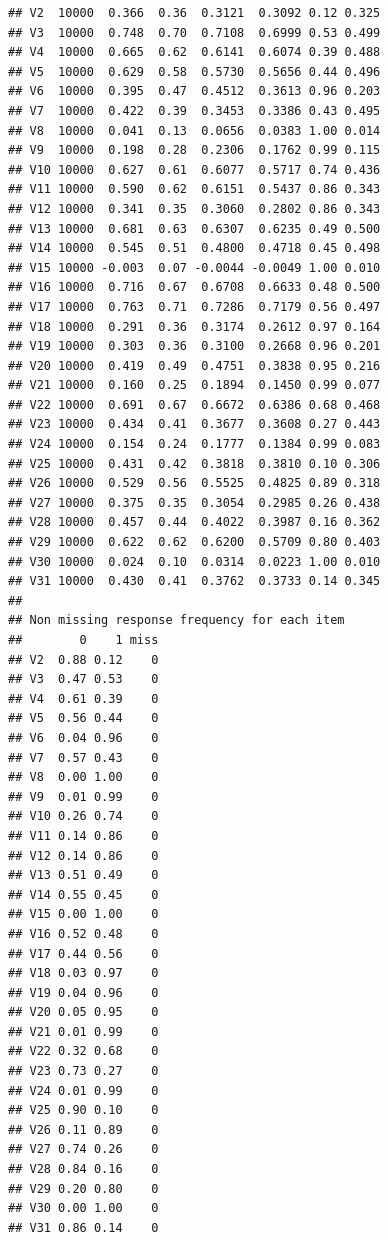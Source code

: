 \documentclass[
  english,
  man]{apa6}
\begin{document}
\begin{verbatim}
## V2  10000  0.366  0.36  0.3121  0.3092 0.12 0.325
## V3  10000  0.748  0.70  0.7108  0.6999 0.53 0.499
## V4  10000  0.665  0.62  0.6141  0.6074 0.39 0.488
## V5  10000  0.629  0.58  0.5730  0.5656 0.44 0.496
## V6  10000  0.395  0.47  0.4512  0.3613 0.96 0.203
## V7  10000  0.422  0.39  0.3453  0.3386 0.43 0.495
## V8  10000  0.041  0.13  0.0656  0.0383 1.00 0.014
## V9  10000  0.198  0.28  0.2306  0.1762 0.99 0.115
## V10 10000  0.627  0.61  0.6077  0.5717 0.74 0.436
## V11 10000  0.590  0.62  0.6151  0.5437 0.86 0.343
## V12 10000  0.341  0.35  0.3060  0.2802 0.86 0.343
## V13 10000  0.681  0.63  0.6307  0.6235 0.49 0.500
## V14 10000  0.545  0.51  0.4800  0.4718 0.45 0.498
## V15 10000 -0.003  0.07 -0.0044 -0.0049 1.00 0.010
## V16 10000  0.716  0.67  0.6708  0.6633 0.48 0.500
## V17 10000  0.763  0.71  0.7286  0.7179 0.56 0.497
## V18 10000  0.291  0.36  0.3174  0.2612 0.97 0.164
## V19 10000  0.303  0.36  0.3100  0.2668 0.96 0.201
## V20 10000  0.419  0.49  0.4751  0.3838 0.95 0.216
## V21 10000  0.160  0.25  0.1894  0.1450 0.99 0.077
## V22 10000  0.691  0.67  0.6672  0.6386 0.68 0.468
## V23 10000  0.434  0.41  0.3677  0.3608 0.27 0.443
## V24 10000  0.154  0.24  0.1777  0.1384 0.99 0.083
## V25 10000  0.431  0.42  0.3818  0.3810 0.10 0.306
## V26 10000  0.529  0.56  0.5525  0.4825 0.89 0.318
## V27 10000  0.375  0.35  0.3054  0.2985 0.26 0.438
## V28 10000  0.457  0.44  0.4022  0.3987 0.16 0.362
## V29 10000  0.622  0.62  0.6200  0.5709 0.80 0.403
## V30 10000  0.024  0.10  0.0314  0.0223 1.00 0.010
## V31 10000  0.430  0.41  0.3762  0.3733 0.14 0.345
## 
## Non missing response frequency for each item
##        0    1 miss
## V2  0.88 0.12    0
## V3  0.47 0.53    0
## V4  0.61 0.39    0
## V5  0.56 0.44    0
## V6  0.04 0.96    0
## V7  0.57 0.43    0
## V8  0.00 1.00    0
## V9  0.01 0.99    0
## V10 0.26 0.74    0
## V11 0.14 0.86    0
## V12 0.14 0.86    0
## V13 0.51 0.49    0
## V14 0.55 0.45    0
## V15 0.00 1.00    0
## V16 0.52 0.48    0
## V17 0.44 0.56    0
## V18 0.03 0.97    0
## V19 0.04 0.96    0
## V20 0.05 0.95    0
## V21 0.01 0.99    0
## V22 0.32 0.68    0
## V23 0.73 0.27    0
## V24 0.01 0.99    0
## V25 0.90 0.10    0
## V26 0.11 0.89    0
## V27 0.74 0.26    0
## V28 0.84 0.16    0
## V29 0.20 0.80    0
## V30 0.00 1.00    0
## V31 0.86 0.14    0
\end{verbatim}
\end{document}
